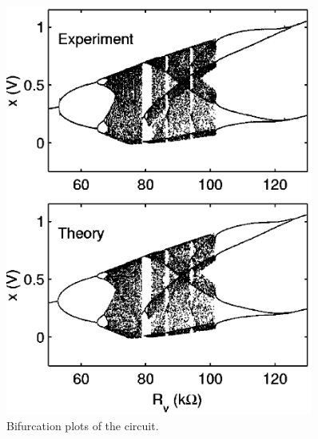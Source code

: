 \begin{minipage}{0.45\textwidth}
    \begin{figure}[h]
    \centering
    \includegraphics[width=0.9\textwidth]{images/e_th-exp.png}
    \caption{Bifurcation plots of the circuit.}
\end{figure}
\end{minipage}
\hfill
